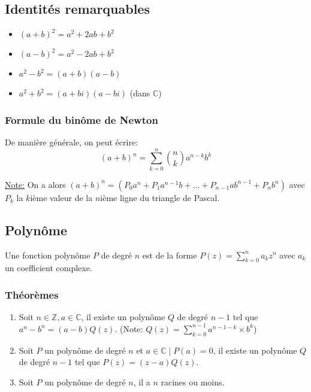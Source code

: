 \documentclass{article}
\begin{document}
\subsection{Identités remarquables}
\begin{itemize}
	\item $(a+b)^2 = a^2 + 2ab + b^2$
	\item $(a-b)^2 = a^2 - 2ab + b^2$
	\item $a^2 - b^2 = (a+b)(a-b)$
	\item $a^2 + b^2 = (a+bi)(a-bi)$ (dans $\mathbb{C}$)
\end{itemize}
\subsubsection{Formule du binôme de Newton}

De manière générale, on peut écrire:
$$(a+b)^n = \sum^n_{k=0}\binom{n}{k}a^{n-k}b^k$$

\underline{Note:} On a alors $(a+b)^n = (P_0a^n + P_1a^{n-1}b + ... + P_{n-1}ab^{n-1} + P_nb^n)$ avec $P_k$ la $k$ième valeur de la $n$ième ligne du triangle de Pascal.

\subsection{Polynôme}
Une fonction polynôme $P$ de degré $n$ est de la forme $P(z) = \sum^n_{k=0}a_kz^n$ avec $a_k$ un coefficient complexe.\\
\subsubsection{Théorèmes}
\begin{enumerate}
	\item Soit $n\in\mathbb{Z}, a\in\mathbb{C}$, il existe un polynôme $Q$ de degré $n-1$ tel que $a^n-b^n = (a-b)Q(z)$. (Note: $Q(z) = \sum_{k=0}^{n-1} a^{n-1-k}\times b^k$)
	\item Soit $P$ un polynôme de degré $n$ et $a\in\mathbb{C} \mid P(a)=0$, il existe un polynôme $Q$ de degré $n-1$ tel que $P(z) = (z-a)Q(z)$.
	\item Soit $P$ un polynôme de degré $n$, il a $n$ racines ou moins.
\end{enumerate}
\end{document}
